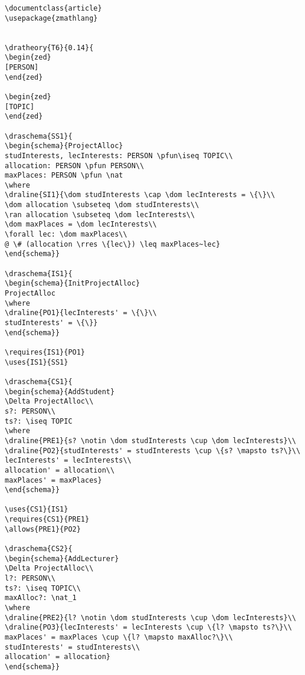 \begin{verbatim}
\documentclass{article}
\usepackage{zmathlang}


\dratheory{T6}{0.14}{
\begin{zed}
[PERSON]
\end{zed}

\begin{zed}
[TOPIC]
\end{zed}

\draschema{SS1}{
\begin{schema}{ProjectAlloc}
studInterests, lecInterests: PERSON \pfun\iseq TOPIC\\
allocation: PERSON \pfun PERSON\\
maxPlaces: PERSON \pfun \nat
\where
\draline{SI1}{\dom studInterests \cap \dom lecInterests = \{\}\\
\dom allocation \subseteq \dom studInterests\\
\ran allocation \subseteq \dom lecInterests\\
\dom maxPlaces = \dom lecInterests\\
\forall lec: \dom maxPlaces\\
@ \# (allocation \rres \{lec\}) \leq maxPlaces~lec}
\end{schema}}

\draschema{IS1}{
\begin{schema}{InitProjectAlloc}
ProjectAlloc
\where
\draline{PO1}{lecInterests' = \{\}\\
studInterests' = \{\}}
\end{schema}}

\requires{IS1}{PO1}
\uses{IS1}{SS1}

\draschema{CS1}{
\begin{schema}{AddStudent}
\Delta ProjectAlloc\\
s?: PERSON\\
ts?: \iseq TOPIC
\where
\draline{PRE1}{s? \notin \dom studInterests \cup \dom lecInterests}\\
\draline{PO2}{studInterests' = studInterests \cup \{s? \mapsto ts?\}\\
lecInterests' = lecInterests\\
allocation' = allocation\\
maxPlaces' = maxPlaces}
\end{schema}}

\uses{CS1}{IS1}
\requires{CS1}{PRE1}
\allows{PRE1}{PO2}

\draschema{CS2}{
\begin{schema}{AddLecturer}
\Delta ProjectAlloc\\
l?: PERSON\\
ts?: \iseq TOPIC\\
maxAlloc?: \nat_1
\where
\draline{PRE2}{l? \notin \dom studInterests \cup \dom lecInterests}\\
\draline{PO3}{lecInterests' = lecInterests \cup \{l? \mapsto ts?\}\\
maxPlaces' = maxPlaces \cup \{l? \mapsto maxAlloc?\}\\
studInterests' = studInterests\\
allocation' = allocation}
\end{schema}}


\end{verbatim}
